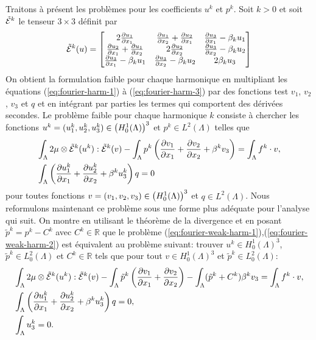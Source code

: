 Traitons à présent les problèmes pour les coefficients $u^k$ et
$p^k$. Soit $k > 0$ et soit $\tilde {\mathcal E}^k$ le tenseur $3\times
3$ définit par
\begin{equation}
  \tilde{\mathcal E}^k(u) = \begin{bmatrix}
     2\frac{\partial u_1}{\partial x_1}
    & \frac{\partial u_1}{\partial x_2} + \frac{\partial u_2}{\partial x_1}
    & \frac{\partial u_3}{\partial x_1} - \beta_k u_1 \\
       \frac{\partial u_2}{\partial x_1} + \frac{\partial u_1}{\partial x_2}
    & 2\frac{\partial u_2}{\partial x_2}
    &  \frac{\partial u_3}{\partial x_2} - \beta_k u_2 \\
       \frac{\partial u_3}{\partial x_1} - \beta_k u_1
    &  \frac{\partial u_3}{\partial x_2} - \beta_k u_2
    & 2\beta_k u_3
  \end{bmatrix}
\end{equation}
On obtient la formulation faible pour chaque harmonique en multipliant
les équations (\ref{eq:fourier-harm-1}) à (\ref{eq:fourier-harm-3})
par des fonctions test $v_1$, $v_2$, $v_3$ et $q$ et en intégrant par
parties les termes qui comportent des dérivées secondes. Le problème
faible pour chaque harmonique $k$ consiste à chercher les fonctions
$u^k = (u_1^k,u_2^k,u_3^k)\in \left( H^1_0(\Lambda) \right)^3$ et $p^k\in
L^2(\Lambda)$ telles que
\begin{align}
  &\int_\Lambda 2\mu\otimes\tilde{\mathcal E}^k(u^k):\tilde{\mathcal E}^k(v)
  - \int_\Lambda p^k\left( \frac{\partial v_1}{\partial x_1} +
    \frac{\partial v_2}{\partial x_2} + \beta^k v_3 \right)
  = \int_\Lambda f^k\cdot v,\label{eq:fourier-weak-harm-1}\\
  &\int_\Lambda \left( \frac{\partial u_1^k}{\partial x_1} + \frac{\partial u_2^k}{\partial x_2} + \beta^k u_3^k \right)q = 0\label{eq:fourier-weak-harm-2}
\end{align}
pour toutes fonctions $v = (v_1,v_2,v_3)\in \left( H^1_0(\Lambda) \right)^3$ et $q\in
L^2(\Lambda)$. Nous reformulons maintenant ce problème sous une forme
plus adéquate pour l'analyse qui suit.
On montre en utilisant le théorème de la divergence et en posant
$\tilde p^k = p^k - C^k$ avec $C^k \in \mathbb R$ que le
problème
(\ref{eq:fourier-weak-harm-1}),(\ref{eq:fourier-weak-harm-2}) est
équivalent au problème suivant: trouver $u^k\in
H^1_0(\Lambda)^3$, $\tilde p^k \in
L^2_0(\Lambda)$ et $C^k\in\mathbb R$ tels que pour tout $v\in
H^1_0(\Lambda)^3$ et $\tilde p^k \in L^2_0(\Lambda)$:
\begin{align}
  &\int_\Lambda 2\mu\otimes\tilde{\mathcal E}^k(u^k):\tilde{\mathcal E}^k(v)
  - \int_\Lambda \tilde p^k\left( \frac{\partial v_1}{\partial x_1} +
    \frac{\partial v_2}{\partial x_2} \right) - \int_\Lambda(\tilde p^k +
  C^k)\beta^k v_3
  = \int_\Lambda f^k\cdot v,\label{eq:fourier-weak-harm-v2-1}\\
  &\int_\Lambda \left( \frac{\partial u_1^k}{\partial x_1} +
    \frac{\partial u_2^k}{\partial x_2} + \beta^k u_3^k \right)q =
  0,\label{eq:fourier-weak-harm-v2-2}\\
  &\int_\Lambda u_3^k = 0.\label{eq:fourier-weak-harm-v2-3}
\end{align}
